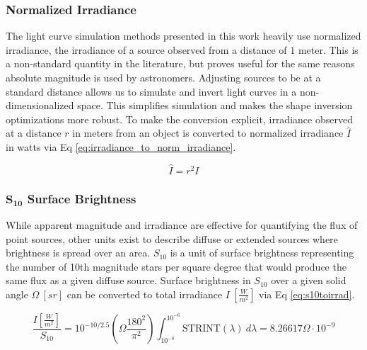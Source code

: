 \subsubsection{Normalized Irradiance}

The light curve simulation methods presented in this work heavily use normalized irradiance, 
the irradiance of a source observed from a distance of $1$ meter. This is a non-standard quantity in the literature, but proves useful for the same reasons
absolute magnitude is used by astronomers. Adjusting sources to be at a standard distance allows us
to simulate and invert light curves in a non-dimensionalized space. This simplifies simulation and
makes the shape inversion optimizations more robust. To make the conversion explicit, irradiance observed
at a distance $r$ in meters from an object is converted to normalized irradiance $\hat{I}$ in watts via Eq
\ref{eq:irradiance_to_norm_irradiance}.

\begin{equation} \label{eq:irradiance_to_norm_irradiance}
  \hat{I} = r^2 I
\end{equation}

\subsubsection{$\mathbf{S_{10}}$ Surface Brightness}

While apparent magnitude and irradiance are effective for quantifying the flux of point sources, other units exist
to describe diffuse or extended sources where brightness is spread over an
area. $S_{10}$ is a unit of surface brightness representing the number of 10th magnitude stars per square degree that would produce the same flux as a given diffuse source.
Surface brightness in $S_{10}$ over a given solid angle $\Omega \: \left[ sr \right]$ can be converted to total irradiance $I \: \left[ \frac{W}{m^2} \right]$ via Eq \ref{eq:s10toirrad}.

\begin{equation} \label{eq:s10toirrad}
 \frac{I \left[ \frac{W}{m^2} \right]}{S_{10}} = 10^{-10/2.5} \left( \Omega \frac{180^2}{\pi^2} \right)
  \int_{10^{-8}}^{10^{-6}}{ \textrm{STRINT}(\lambda) \: d\lambda} = 8.26617 \Omega \cdot 10^{-9}
\end{equation}


